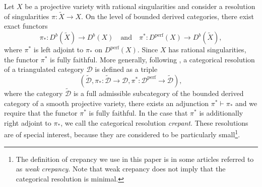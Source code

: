 \documentclass[a4paper, twoside, 11pt]{amsart}
\theoremstyle{definition}
\theoremstyle{remark}
\numberwithin{equation}{theorem}
\DeclareMathOperator{\lilperf}{perf}
\newcommand{\dbx}{D^b(X)}
\newcommand{\perf}{\mathcal{D}^{\text{perf}}}
\begin{document}
Let $X$ be a projective variety with rational singularities and consider a resolution of singularities $\pi\colon \widetilde{X} \to X$. On the level of bounded derived categories, there exist exact functors  
\begin{equation*}
	\pi_*\colon D^b(\widetilde{X}) \to \dbx \quad \text{and} \quad \pi^*\colon D^{\lilperf}(X) \to D^b(\widetilde{X}),
\end{equation*} 
where $\pi^*$ is left adjoint to $\pi_*$ on $D^{\lilperf}(X)$. Since $X$ has rational singularities, the functor $\pi^*$ is fully faithful. More generally, following \cite[Definition 3.2]{Lefschetz_Decomp}, a categorical resolution of a triangulated category $\mathcal{D}$ is defined as a triple $$(\widetilde{\mathcal{D}}, \pi_*\colon \widetilde{\mathcal{D}} \to \mathcal{D}, \pi^*\colon \perf \to \widetilde{\mathcal{D}}),$$ where the category $\widetilde{\mathcal{D}}$ is a full admissible subcategory of the bounded derived category of a smooth projective variety, there exists an adjunction $\pi^*\vdash \pi_*$ and we require that the functor $\pi^*$ is fully faithful. In the case that $\pi^*$ is additionally right adjoint to $\pi_*$, we call the categorical resolution \textit{crepant}. These resolutions are of special interest, because they are considered to be particularly small\footnote{The definition of crepancy we use in this paper is in some articles referred to as \textit{weak crepancy}. Note that weak crepancy does not imply that the categorical resolution is minimal.}.
\end{document}
